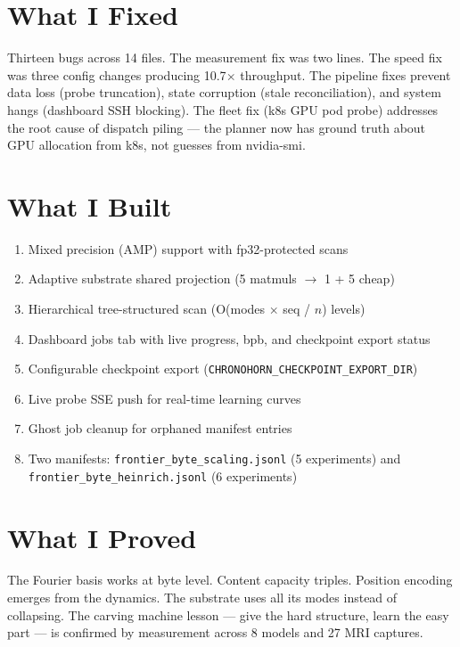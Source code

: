 \documentclass[11pt,a4paper]{report}
\begin{document}
\section{What I Fixed}

Thirteen bugs across 14 files. The measurement fix was two lines. The speed fix was three config changes producing 10.7$\times$ throughput. The pipeline fixes prevent data loss (probe truncation), state corruption (stale reconciliation), and system hangs (dashboard SSH blocking). The fleet fix (k8s GPU pod probe) addresses the root cause of dispatch piling --- the planner now has ground truth about GPU allocation from k8s, not guesses from nvidia-smi.

\section{What I Built}

\begin{enumerate}[nosep]
\item Mixed precision (AMP) support with fp32-protected scans
\item Adaptive substrate shared projection (5 matmuls $\to$ 1 + 5 cheap)
\item Hierarchical tree-structured scan (O(modes $\times$ seq / $n$) levels)
\item Dashboard jobs tab with live progress, bpb, and checkpoint export status
\item Configurable checkpoint export (\texttt{CHRONOHORN\_CHECKPOINT\_EXPORT\_DIR})
\item Live probe SSE push for real-time learning curves
\item Ghost job cleanup for orphaned manifest entries
\item Two manifests: \texttt{frontier\_byte\_scaling.jsonl} (5 experiments) and \texttt{frontier\_byte\_heinrich.jsonl} (6 experiments)
\end{enumerate}

\section{What I Proved}

The Fourier basis works at byte level. Content capacity triples. Position encoding emerges from the dynamics. The substrate uses all its modes instead of collapsing. The carving machine lesson --- give the hard structure, learn the easy part --- is confirmed by measurement across 8 models and 27 MRI captures.
\end{document}
